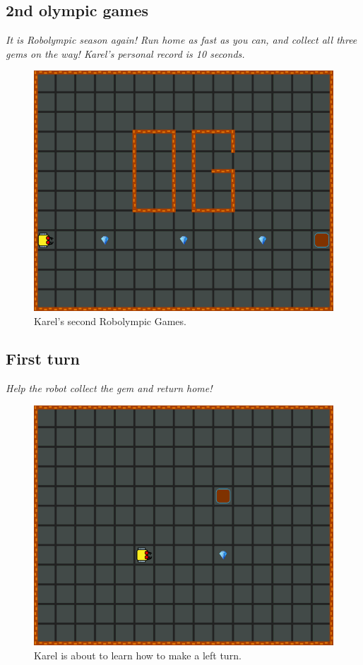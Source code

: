 \subsection{2nd olympic games}

{\em It is Robolympic season again! Run home as fast as you can, 
and collect all three gems on the way! Karel's personal record is 10 seconds.}


\begin{figure}[!ht]
\begin{center}
\includegraphics[height=0.4\textwidth]{img/a04.png}
\end{center}
\vspace{-4mm}
\caption{Karel's second Robolympic Games.}
\label{fig:a04}
\vspace{-1cm}
\end{figure}
\noindent


\subsection{First turn}

{\em Help the robot collect the gem and return home!}

\begin{figure}[!ht]
\begin{center}
\includegraphics[height=0.4\textwidth]{img/a05.png}
\end{center}
\vspace{-4mm}
\caption{Karel is about to learn how to make a left turn.}
\label{fig:a05}
\vspace{-1cm}
\end{figure}
\noindent


